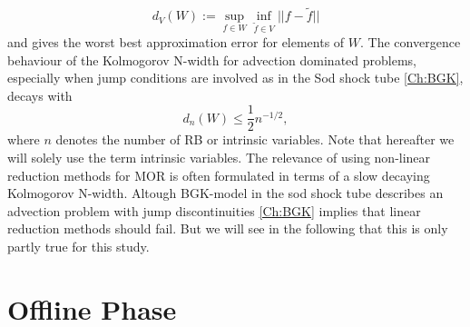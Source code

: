 \begin{equation}
	d_{V}(W):= \sup_{f \in W} \inf_{\tilde{f} \in V} ||f-\tilde{f}||
	\label{Eq:Kolmogorov}
\end{equation}
and gives the worst best approximation error for elements of \(W\). The convergence behaviour of the Kolmogorov N-width for advection dominated problems, especially when jump conditions are involved as in the Sod shock tube \cref{Ch:BGK}, decays with
\begin{equation}
	d_n(W) \leq \frac{1}{2} n^{-1/2},
	\label{Eq:KolmoAdv}
\end{equation}
where \(n\) denotes the number of RB or intrinsic variables. Note that hereafter we will solely use the term intrinsic variables\cite{ohlberger2015reduced}. The relevance of using non-linear reduction methods for MOR is often formulated in terms of a slow decaying Kolmogorov N-width. Altough BGK-model in the sod shock tube describes an advection problem with jump discontinuities \cref{Ch:BGK} implies that linear reduction methods should fail. But we will see in the following that this is only partly true for this study.
\section{Offline Phase}

